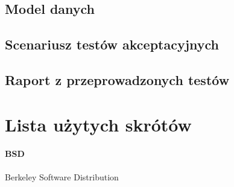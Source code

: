 \documentclass[10pt,a4paper]{article}
\begin{document}
\subsection{Model danych}

\subsection{Scenariusz testów akceptacyjnych}

\subsection{Raport z przeprowadzonych testów}

\section{Lista użytych skrótów}

\label{abbr:bsd}
\paragraph{BSD} Berkeley Software Distribution
\end{document}

